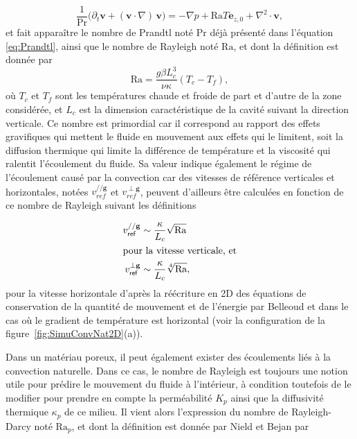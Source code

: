 \begin{equation}
	\frac{1}{\mathrm{Pr}}\big(\partial_t \mathbf{v} + (\mathbf{v} \cdot \nabla)\,\mathbf{v}\big) = -\nabla p + \mathrm{Ra} T \mathbf e_{z,0} + \nabla^2 \cdot \mathbf{v},
	\label{eq:NonDim_NavierStokes_Boussinesq_QtMvt}
\end{equation}
et fait apparaître le nombre de Prandtl noté $\mathrm{Pr}$ déjà présenté dans l'équation \eqref{eq:Prandtl}, ainsi que le nombre de Rayleigh noté $\mathrm{Ra}$, et dont la définition est donnée par 
\begin{equation}
	\mathrm{Ra} = \frac{g \beta L_c^3}{\nu \kappa} (T_c-T_f),
	\label{eq:NbrRayleigh}
\end{equation}
où $T_c$ et $T_f$ sont les températures chaude et froide de part et d'autre de la zone considérée, et $L_c$ est la dimension caractéristique de la cavité suivant la direction verticale. Ce nombre est primordial car il correspond au rapport des effets gravifiques qui mettent le fluide en mouvement aux effets qui le limitent, soit la diffusion thermique qui limite la différence de température et la viscosité qui ralentit l'écoulement du fluide. Sa valeur indique également le régime de l'écoulement causé par la convection car des vitesses de référence verticales et horizontales, notées $v_{ref}^{// \mathbf g}$ et $v_{ref}^{\perp \mathbf g}$, peuvent d'ailleurs être calculées en fonction de ce nombre de Rayleigh suivant les définitions

\begin{subequations}
	\begin{align}
		v_{\sf ref}^{// \mathbf g} &\sim \frac{\kappa}{L_c}\sqrt{\mathrm{Ra}} \label{eq:VitesseReferenceV_Rayleigh}\\
		\intertext{pour la vitesse verticale, et}
		v_{\sf ref}^{\perp \mathbf g} &\sim \frac{\kappa}{L_c}\sqrt[4]{\mathrm{Ra}},	\label{eq:VitesseReferenceH_Rayleigh}
	\end{align}
	\label{eq:VitesseReference_Rayleigh}%
\end{subequations}
pour la vitesse horizontale d'après la réécriture en 2D des équations de conservation de la quantité de mouvement et de l'énergie par Belleoud \cite{belleoud_etude_2016} et dans le cas où le gradient de température est horizontal (voir la configuration de la figure~\ref{fig:SimuConvNat2D}(a)).\medskip

Dans un matériau poreux, il peut également exister des écoulements liés à la convection naturelle. Dans ce cas, le nombre de Rayleigh est toujours une notion utile pour prédire le mouvement du fluide à l'intérieur, à condition toutefois de le modifier pour prendre en compte la perméabilité $K_p$ ainsi que la diffusivité thermique $\kappa_p$ de ce milieu. Il vient alors l'expression du nombre de Rayleigh-Darcy noté $\mathrm{Ra}_p$, et dont la définition est donnée par Nield et Bejan \cite{nield_convection_2013} par

